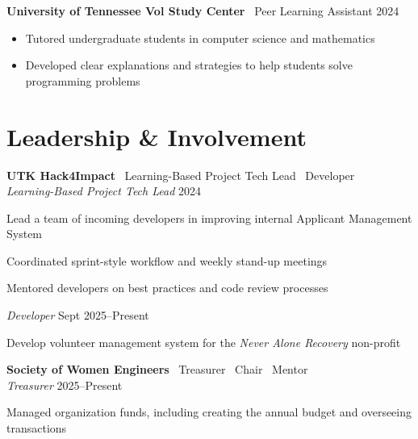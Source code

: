 \documentclass[11pt,a4paper]{article}
\begin{document}
\noindent
\textbf{University of Tennessee Vol Study Center} \textbar\ Peer Learning Assistant \hfill 2024 \vspace{-4pt}
\begin{itemize}[leftmargin=*, topsep=0pt, itemsep=0pt, partopsep=0pt, parsep=0pt]
  \small
  \item Tutored undergraduate students in computer science and mathematics
  \item Developed clear explanations and strategies to help students solve programming problems
\end{itemize}
\vspace{-4pt}

\section*{Leadership \& Involvement}

\noindent
\textbf{UTK Hack4Impact} \textbar\ Learning-Based Project Tech Lead \textbar\ Developer \hfill \\ 
\noindent\textit{Learning-Based Project Tech Lead} \vspace{-6pt} \hfill 2024
\begin{itemize}[leftmargin=*, topsep=0pt, itemsep=1pt, partopsep=0pt, parsep=0pt]
  {\small
  \item Lead a team of incoming developers in improving internal Applicant Management System 
  \item Coordinated sprint-style workflow and weekly stand-up meetings
  \item Mentored developers on best practices and code review processes
  }
\end{itemize}
\vspace{-5pt}

\noindent\textit{Developer} \vspace{-6pt} \hfill Sept 2025--Present
\begin{itemize}[leftmargin=*, topsep=0pt, itemsep=1pt, partopsep=0pt, parsep=0pt]
  {\small
  \item Develop volunteer management system for the \textit{Never Alone Recovery} non-profit 
  }
\end{itemize}
\vspace{-2pt}

\noindent
\textbf{Society of Women Engineers} \textbar\ Treasurer \textbar\ Chair \textbar\ Mentor \\ [-1pt]
\noindent\textit{Treasurer} \vspace{-6pt} \hfill 2025--Present
\begin{itemize}[leftmargin=*, topsep=0pt, itemsep=1pt, partopsep=0pt, parsep=0pt]
  {\small
  \item Managed organization funds, including creating the annual budget and overseeing transactions
  }
\end{itemize}
\vspace{-5pt}
\end{document}
